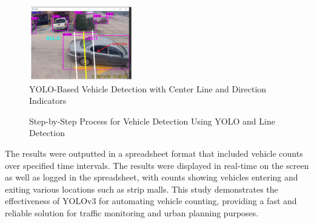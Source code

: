 {\begin{enumerate}
\begin{itemize}
  \end{itemize}
\end{enumerate}
%
\begin{figure}[h!]
    \centering
    \includegraphics[width=0.4\textwidth]{images/Paper 3 Algorithm Implementation.png}
    \caption{YOLO-Based Vehicle Detection with Center Line and Direction Indicators}
\end{figure}
%
\begin{figure}[h!]
    \centering
    \caption{Step-by-Step Process for Vehicle Detection Using YOLO and Line Detection}
\end{figure}
%
The results were outputted in a spreadsheet format that included vehicle counts over specified time intervals. The results were displayed in real-time on the screen as well as logged in the spreadsheet, with counts showing vehicles entering and exiting various locations such as strip malls. This study demonstrates the effectiveness of YOLOv3 for automating vehicle counting, providing a fast and reliable solution for traffic monitoring and urban planning purposes.\\\\
}
